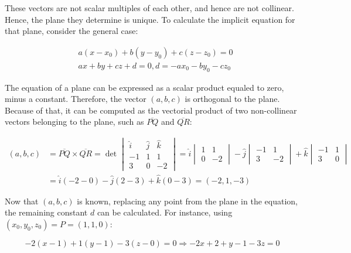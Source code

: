\documentclass{article}
\begin{document}
These vectors are not scalar multiples of each other, and hence are not collinear. Hence, the plane they determine is unique. To calculate the implicit equation for that plane, consider the general case:

\begin{subequations}
\begin{align}
& a (x-x_0) + b (y-y_0) + c (z-z_0) = 0 \\
& a x + b y + c z + d = 0, d = -a x_0 -b y_0 -c z_0
\end{align}
\end{subequations}

The equation of a plane can be expressed as a scalar product equaled to zero, minus a constant. Therefore, the vector $(a,b,c)$ is orthogonal to the plane. Because of that, it can be computed as the vectorial product of two non-collinear vectors belonging to the plane, such as $\overline{PQ}$ and $\overline{QR}$:

\begin{subequations}
\begin{align}
(a,b,c) &= \overline{PQ} \times \overline{QR} = \det \begin{vmatrix}
\hat{i} & \hat{j} & \hat{k} \\
-1 & 1 & 1 \\
3 & 0 & -2
\end{vmatrix} = \hat{i} \begin{vmatrix}1 & 1 \\ 0 & -2\end{vmatrix} - \hat{j} \begin{vmatrix}-1 & 1 \\ 3 & -2\end{vmatrix} + \hat{k} \begin{vmatrix}-1 & 1 \\ 3 & 0\end{vmatrix} \\
& = \hat{i} (-2-0) -\hat{j} (2-3) +\hat{k} (0-3) = (-2, 1, -3)
\end{align}
\end{subequations}

Now that $(a,b,c)$ is known, replacing any point from the plane in the equation, the remaining constant $d$ can be calculated. For instance, using $(x_0, y_0, z_0) = P = (1, 1, 0)$:

\begin{equation}
-2 (x-1) + 1 (y-1) - 3 (z-0) = 0 \Rightarrow -2x +2 +y -1 -3z = 0 
\end{equation}
\end{document}
